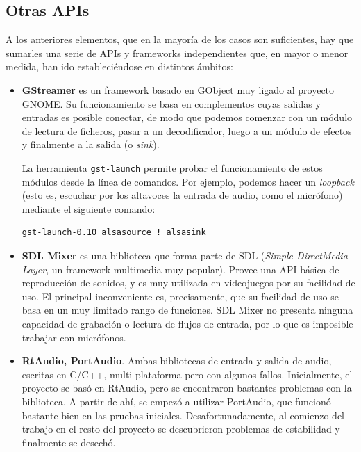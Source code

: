 \subsection{Otras APIs}

A los anteriores elementos, que en la mayoría de los casos son suficientes, hay
que sumarles una serie de APIs y frameworks independientes que, en mayor o menor
medida, han ido estableciéndose en distintos ámbitos: 

\begin{itemize}
\item \textbf{GStreamer} es un framework basado en GObject muy ligado al
  proyecto GNOME. Su funcionamiento se basa en complementos cuyas salidas y
  entradas es posible conectar, de modo que podemos comenzar con un módulo de
  lectura de ficheros, pasar a un decodificador, luego a un módulo de efectos y
  finalmente a la salida (o \textit{sink}). 

  La herramienta \texttt{gst-launch} permite probar el funcionamiento de estos
  módulos desde la línea de comandos. Por ejemplo, podemos hacer un
  \textit{loopback} (esto es, escuchar por los altavoces la entrada de audio,
  como el micrófono) mediante el siguiente comando:

\begin{verbatim}
gst-launch-0.10 alsasource ! alsasink
\end{verbatim}

\item \textbf{SDL Mixer} es una biblioteca que forma parte de SDL
  (\textit{Simple DirectMedia Layer}, un framework multimedia muy
  popular). Provee una API básica de reproducción de sonidos, y es muy utilizada
  en videojuegos por su facilidad de uso. El principal inconveniente es,
  precisamente, que su facilidad de uso se basa en un muy limitado rango de
  funciones. SDL Mixer no presenta ninguna capacidad de grabación o lectura de
  flujos de entrada, por lo que es imposible trabajar con micrófonos.

\item \textbf{RtAudio, PortAudio}. Ambas bibliotecas de entrada y salida de
  audio, escritas en C/C++, multi-plataforma pero con algunos
  fallos. Inicialmente, el proyecto se basó en RtAudio, pero se encontraron
  bastantes problemas con la biblioteca. A partir de ahí, se empezó a utilizar
  PortAudio, que funcionó bastante bien en las pruebas
  iniciales. Desafortunadamente, al comienzo del trabajo en el resto del
  proyecto se descubrieron problemas de estabilidad y finalmente se desechó.

\end{itemize}

